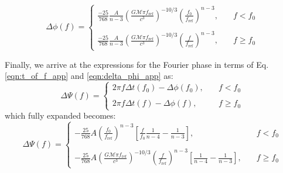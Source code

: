 \begin{equation}\label{eqn:delta_phi_app}
\Delta \phi(f) = \left \{
                     \begin{array}{ll}
                     \frac{-25}{768} \frac{A}{n-3} \left ( \frac{G \mathcal{M} \pi f_{\mathrm{ref}}}{c^3} \right )^{-10/3} \left ( \frac{f_0}{f_{\mathrm{ref}}} \right )^{n-3}, &\quad  f < f_0 \\ \\
                     \frac{-25}{768} \frac{A}{n-3} \left ( \frac{G \mathcal{M} \pi f_{\mathrm{ref}}}{c^3} \right )^{-10/3} \left ( \frac{f}{f_{\mathrm{ref}}} \right )^{n-3}, &\quad  f \ge f_0
                     \end{array}
                     \right.
\end{equation}

Finally, we arrive at the expressions for the Fourier phase in terms of Eq. \ref{eqn:t_of_f_app} and \ref{eqn:delta_phi_app} as:
\begin{equation}\label{eqn:fourier_phase_app}
\Delta \Psi(f) = \left \{
                     \begin{array}{ll}
                      2 \pi f \Delta t(f_0) - \Delta \phi(f_0), &\quad  f < f_0 \\ \\
                      2 \pi f \Delta t(f) - \Delta \phi(f), &\quad f \ge f_0
                     \end{array}
                     \right.
\end{equation}
which fully expanded becomes:
\begin{equation}\label{eqn:fourier_phase_final_app}
\Delta \Psi(f) = \left \{
                     \begin{array}{ll}
                      - \frac{25}{768} A \left ( \frac{f_0}{f_{\mathrm{ref}}} \right)^{n-3} \left [ \frac{f}{f_0}\frac{1}{n-4} - \frac{1}{n-3} \right], &\quad  f < f_0 \\ \\
                      - \frac{25}{768} A \left (\frac{G \mathcal{M} \pi f_{\mathrm{ref}}}{c^3} \right )^{-10/3} \left ( \frac{f}{f_{\mathrm{ref}}} \right )^{n-3} \left [\frac{1}{n-4} - \frac{1}{n-3} \right ],  &\quad  f \ge f_0
                      \end{array}
                 \right.
\end{equation}
